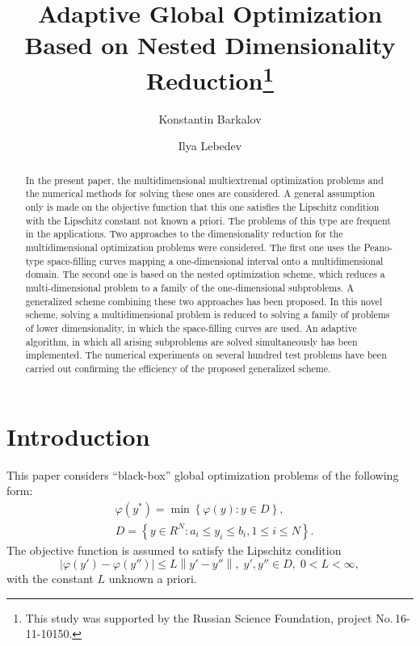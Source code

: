 \documentclass[runningheads]{llncs}
\begin{document}
%
\title{Adaptive Global Optimization Based on Nested Dimensionality 
Reduction\thanks{This study was supported by the Russian Science Foundation, 
project No.\,16-11-10150.}}
%
%
\author{Konstantin Barkalov %
\and Ilya Lebedev %
}
%
%
%
\maketitle              %
%
\begin{abstract}

In the present paper, the multidimensional multiextremal optimization 
problems and the numerical methods for solving these ones are considered. A 
general assumption only is made on the objective function that this one 
satisfies the Lipschitz condition with the Lipschitz constant not known 
a priori. The problems of this type are frequent in the applications. 
Two approaches to the dimensionality reduction for the multidimensional 
optimization problems were considered. The first one uses the Peano-type 
space-filling curves mapping a one-dimensional interval onto a multidimensional 
domain. The second one is based on the nested optimization scheme, which 
reduces a multi-dimensional problem to a family of the one-dimensional 
subproblems. A generalized scheme combining these two approaches has been 
proposed. In this novel scheme, solving a multidimensional problem is 
reduced to solving a family of problems of lower dimensionality, in 
which the space-filling curves are used. An adaptive algorithm, in which all 
arising subproblems are solved simultaneously has been implemented. The 
numerical experiments on several hundred test problems have been carried out 
confirming the efficiency of the proposed generalized scheme.

\end{abstract}
%
%
%
\section{Introduction}
This paper considers ``black-box'' global optimization problems of the 
following form:
\begin{eqnarray}\label{main_problem}
& \varphi(y^\ast)=\min{\left\{\varphi(y):y\in D\right\}},\\
& D=\left\{y\in R^N: a_i\leq y_i \leq b_i, 1\leq i \leq N\right\}. \nonumber
\end{eqnarray}
The objective function is assumed to satisfy the Lipschitz condition 
\[
\left|\varphi(y')-\varphi(y'')\right|\leq L\left\|y'-y''\right\|,\; y',y'' \in
 D,\; 0<L<\infty,
\]
with the constant $L$ unknown a priori.
\end{document}
